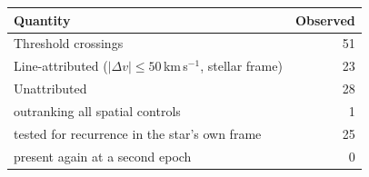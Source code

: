 \begin{tabular}{@{}lr@{}}
\hline
Quantity & Observed \\
\hline
Threshold crossings & 51 \\
Line-attributed ($|\Delta v|\leq50$\,km\,s$^{-1}$, stellar frame) & 23 \\
Unattributed & 28 \\
\quad outranking all spatial controls & 1 \\
\quad tested for recurrence in the star's own frame & 25 \\
\quad present again at a second epoch & 0 \\
\hline
\end{tabular}
